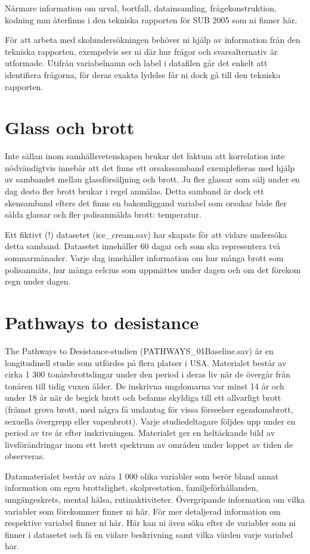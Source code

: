 \documentclass[
]{book}
\begin{document}
Närmare information om urval, bortfall, datainsamling, frågekonstruktion, kodning mm återfinns
i den tekniska rapporten för SUB 2005 som ni finner här.

För att arbeta med skolundersökningen behöver ni hjälp av information från den tekniska
rapporten, exempelvis ser ni där hur frågor och svarsalternativ är utformade. Utifrån variabelnamn och label i datafilen går det enkelt att identifiera frågorna, för deras exakta
lydelse får ni dock gå till den tekniska rapporten.

\hypertarget{glass-och-brott}{%
\section{Glass och brott}\label{glass-och-brott}}

Inte sällan inom samhällsvetenskapen brukar det faktum att korrelation inte nödvändigtvis innebär att det finns ett orsakssamband exemplefieras med hjälp av sambandet mellan glassförsäljning och brott. Ju fler glassar som sälj under en dag desto fler brott brukar i regel anmälas. Detta samband är dock ett skensamband efters det finns en bakomliggand variabel som orsakar både fler sålda glassar och fler polisanmälda brott: temperatur.

Ett fiktivt (!) datasetet (ice\_cream.sav) har skapats för att vidare undersöka detta samband. Datasetet innehåller 60 dagar och som ska representera två sommarmånader. Varje dag innehåller information om hur många brott som polisanmäts, hur många celcius som uppmättes under dagen och om det förekom regn under dagen.

\hypertarget{pathways-to-desistance}{%
\section{Pathways to desistance}\label{pathways-to-desistance}}

The Pathways to Desistance-studien (PATHWAYS\_01Baseline.sav) är en longitudinell studie som utfördes på flera platser i USA. Materialet består av cirka 1 300 tonårsbrottslingar under den period i deras liv när de övergår från tonåren till tidig vuxen ålder. De inskrivna ungdomarna var minst 14 år och under 18 år när de begick brott och befanns skyldiga till ett allvarligt brott (främst grova brott, med några få undantag för vissa förseelser egendomsbrott, sexuella övergrepp eller vapenbrott). Varje studiedeltagare följdes upp under en period av tre år efter inskrivningen. Materialet ger en heltäckande bild av livsförändringar inom ett brett spektrum av områden under loppet av tiden de observeras.

Datamaterialet består av nära 1 000 olika variabler som berör bland annat information om egen brottslighet, skolprestation, familjeförhållanden, umgängeskrets, mental hälsa, rutinaktiviteter. Övergripande information om vilka variabler som förekommer finner ni här. För mer detaljerad information om respektive variabel finner ni här. Här kan ni även söka efter de variabler som ni finner i datasetet och få en vidare beskrivning samt vilka värden varje variabel har.

  
\end{document}
